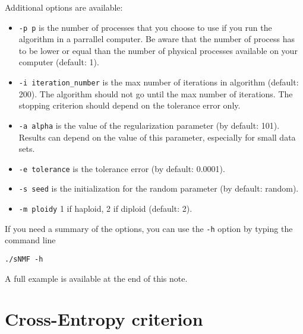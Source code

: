 \documentclass[10pt,a4paper]{article}
\begin{document}
\noindent
Additional options are available:
\begin{itemize}
\item \verb|-p p| is the number of processes that you choose to use if you run the algorithm in 
a parrallel computer. Be aware that the number of process has to be lower or equal than the number 
of physical processes available on your computer (default: 1).
\item \verb|-i iteration_number| is the max number of iterations in algorithm (default: 200). 
The algorithm should not go until the max number of iterations. The stopping criterion should 
depend on the tolerance error only.
\item \verb|-a alpha| is the value of the regularization parameter (by default: 101). Results can depend on the value of this parameter, especially for small data sets. 
\item \verb|-e tolerance| is the tolerance error (by default: 0.0001). 
\item \verb|-s seed| is the initialization for the random parameter (by default: random). 
\item \verb|-m ploidy|  1 if haploid, 2 if diploid (default: 2). 
\end{itemize}


\noindent
If you need a summary of the options, you can use the \verb|-h| option by typing the command line
\footnotesize
\begin{Verbatim}[frame=single]
./sNMF -h
\end{Verbatim}
\noindent
\normalsize

\noindent
A full example is available at the end of this note.

\section{Cross-Entropy criterion}
\end{document}
